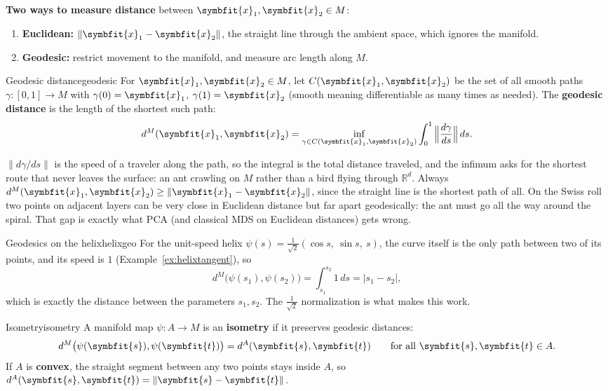 \documentclass[11pt]{article}
\newcommand{\bm}[1]{\symbfit{#1}}
\newcommand{\R}{\mathbb{R}}
\newcommand{\vx}{\bm{x}}
\newcommand{\norm}[1]{\left\lVert #1\right\rVert}
\begin{document}
\textbf{Two ways to measure distance} between $\vx_1,\vx_2\in M$:
\begin{enumerate}[nosep,label=\arabic*)]
\item \textbf{Euclidean:} $\norm{\vx_1-\vx_2}$, the straight line through the ambient space, which ignores the manifold.
\item \textbf{Geodesic:} restrict movement to the manifold, and measure arc length along $M$.
\end{enumerate}

\begin{definition}{Geodesic distance}{geodesic}
For $\vx_1,\vx_2\in M$, let $C(\vx_1,\vx_2)$ be the set of all smooth paths $\gamma:[0,1]\to M$ with $\gamma(0)=\vx_1$, $\gamma(1)=\vx_2$ (smooth meaning
differentiable as many times as needed). The \textbf{geodesic distance} is the length of the shortest such path:
\[
d^M(\vx_1,\vx_2)=\inf_{\gamma\in C(\vx_1,\vx_2)}\int_0^1\Big\|\frac{d\gamma}{ds}\Big\|\,ds .
\]
\end{definition}

\begin{intuition}
$\norm{d\gamma/ds}$ is the speed of a traveler along the path, so the integral is the total distance traveled, and the
infimum asks for the shortest route that never leaves the surface: an ant crawling on $M$ rather than a bird flying
through $\R^d$. Always $d^M(\vx_1,\vx_2)\ge\norm{\vx_1-\vx_2}$, since the straight line is the shortest path of all. On the Swiss roll two points on
adjacent layers can be very close in Euclidean distance but far apart geodesically: the ant must go all the way
around the spiral. That gap is exactly what PCA (and classical MDS on Euclidean distances) gets wrong.
\end{intuition}

\begin{example}{Geodesics on the helix}{helixgeo}
For the unit-speed helix $\psi(s)=\tfrac1{\sqrt2}(\cos s,\ \sin s,\ s)$, the curve itself is the only path between two of its points, and its speed
is $1$ (Example~\ref{ex:helixtangent}), so
\[
d^M\big(\psi(s_1),\psi(s_2)\big)=\int_{s_1}^{s_2}1\,ds=|s_1-s_2| ,
\]
which is exactly the distance between the parameters $s_1,s_2$. The $\tfrac1{\sqrt2}$ normalization is what makes this work.
\end{example}

\begin{definition}{Isometry}{isometry}
A manifold map $\psi:A\to M$ is an \textbf{isometry} if it preserves geodesic distances:
\[
d^M\big(\psi(\bm s),\psi(\bm t)\big)=d^A(\bm s,\bm t)\qquad\text{for all }\bm s,\bm t\in A .
\]
If $A$ is \textbf{convex}, the straight segment between any two points stays inside $A$, so $d^A(\bm s,\bm t)=\norm{\bm s-\bm t}$.
\end{definition}
\end{document}
